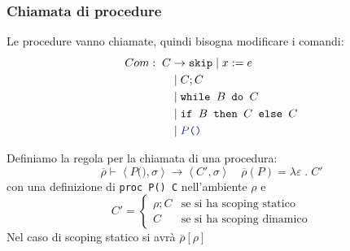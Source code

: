 \documentclass[a4paper]{article}
\begin{document}
\subsubsection{Chiamata di procedure}
Le procedure vanno chiamate, quindi bisogna modificare i comandi:
\[
  \begin{aligned}
    Com: \; C & \to \texttt{skip} \mid x := e  \\
              & \mid C; C  \\
              & \mid \texttt{while } B \texttt{ do } C \\
              & \mid \texttt{if } B \texttt{ then } C \texttt{ else } C  \\
              & \mid \mathcolor{Blue}{P \texttt{()}}
  \end{aligned}
\] 

\vspace{1em}
\noindent
Definiamo la regola per la chiamata di una procedura:
\[
  \overline{\rho} \vdash \left< P \texttt{()}, \sigma \right> \to 
  \left<C', \sigma  \right> \quad \overline{\rho}(P) = \lambda \varepsilon \;.\; C'
\] 
con una definizione di \texttt{proc P() C} nell'ambiente \( \rho \) e
\[
  C' = \begin{cases}
    \rho ; C & \text{se si ha scoping statico} \\
    C & \text{se si ha scoping dinamico}
  \end{cases}
\] 
Nel caso di scoping statico si avrà \( \overline{\rho}[\rho] \) 
\end{document}
